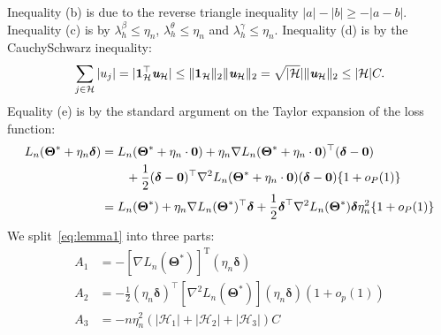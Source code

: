 \documentclass[12pt,letter]{article}\usepackage[]{graphicx}\usepackage[]{color}
\newcommand{\bThetastar}{\boldsymbol{\Theta}^{*}}
\newcommand{\bdelta}{\boldsymbol{\delta}}
\newcommand{\mH}{\mathcal{H}}
\begin{document}
Inequality (b) is due to the reverse triangle inequality $|a|-|b|\geq-|a-b|$. Inequality (c) is by $\lambda_{h}^\beta\leq\eta_{n}$, $\lambda_{h}^{\theta}\leq\eta_{n}$ and $\lambda_{h}^{\gamma}\leq\eta_{n}$. Inequality (d) is by the Cauchy\textendash Schwarz
inequality:
\[
\sum_{j\in \mathcal{H}}|u_{j}|=|\mathbf{1}_{\mH}^{\top}\textit{\textbf{u}}_{\mH}|\leq\|\mathbf{1}_{\mH}\|_2 \|\textit{\textbf{u}}_{\mH}\|_2=\sqrt{|\mH}|\|\textit{\textbf{u}}_{\mH}\|_2\leq|\mH|C.
\]
Equality (e) is by the standard argument on the Taylor expansion of the loss function:
\begin{align*}
L_{n}(\bThetastar+\eta_{n}\bdelta) & =L_{n}(\bThetastar+\eta_{n}\cdot\mathbf{0})+\eta_{n}\nabla L_{n}(\bThetastar+\eta_{n}\cdot\mathbf{0})^{\top}(\bdelta-\mathbf{0})\\
& \qquad+\frac{1}{2}(\bdelta-\mathbf{0})^{\top}\nabla^{2}L_{n}(\bThetastar+\eta_{n}\cdot\mathbf{0})(\bdelta-\mathbf{0})\{1+\op(1)\}\\
& =L_{n}(\bThetastar)+\eta_{n}\nabla L_{n}(\bThetastar)^{\top}\bdelta+\frac{1}{2}\bdelta^{\top}\nabla^{2}L_{n}(\bThetastar)\bdelta\eta_{n}^{2}\{1+\op(1)\}
\end{align*}
We split~\eqref{eq:lemma1} into three parts:
\[
\begin{aligned}A_{1} & =-\left[\nabla L_{n}\left(\boldsymbol{\Theta}^{*}\right)\right]^{\mathrm{T}}\left(\eta_{n}\boldsymbol{\delta}\right)\\
A_{2} & =-\frac{1}{2}\left(\eta_{n}\boldsymbol{\delta}\right)^{\top}\left[\nabla^{2}L_{n}\left(\boldsymbol{\Theta}^{*}\right)\right]\left(\eta_{n}\boldsymbol{\delta}\right)\left(1+o_{p}(1)\right)\\
A_{3} & =-n\eta_{n}^{2}\left(\left|\mathcal{H}_{1}\right|+\left|\mathcal{H}_{2}\right|+\left|\mathcal{H}_{3}\right|\right)C
\end{aligned}
\]
\end{document}
